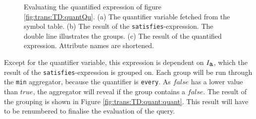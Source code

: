 \begin{myExample}
\begin{figure}[h]
\caption[Evaluating the quantified expression]{Evaluating the quantified expression of figure
\ref{fig:trans:TD:quantQu}. (a) The quantifier variable fetched from the symbol table. (b) The result of the
\texttt{satisfies}-expression. The double line illustrates the groups. (c) The result of the quantified
expression. Attribute names are shortened. \label{fig:trans:TD:quantInter} }
\end{figure}

Except for the quantifier variable, this expression is dependent on $I_{\mbox{\texttt{a}}}$, which the result of
the \texttt{satisfies}-expression is grouped on. Each group will be run through the \texttt{min} aggregator,
because the quantifier is \texttt{every}. As $false$ has a lower value than $true$, the aggregator will reveal if
the group contains a $false$. The result of the grouping is shown in Figure \ref{fig:trans:TD:quant:quant}. This
result will have to be renumbered to finalise the evaluation of the query.
\end{myExample}